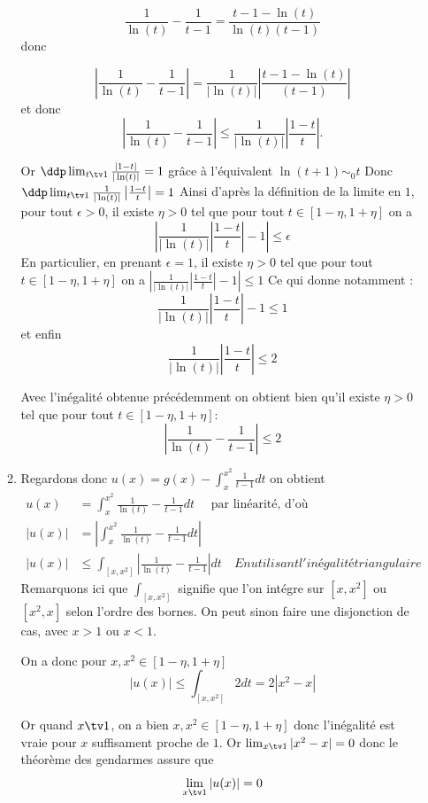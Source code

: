\begin{correction}
\begin{enumerate}
\begin{enumerate}
$$\frac{1}{\ln(t)} -\frac{1}{t-1} = \frac{t-1 -\ln(t)}{\ln(t)(t-1)}$$
donc 


$$\left| \frac{1}{\ln(t)} -\frac{1}{t-1}\right| =\frac{1}{|\ln(t)|}\left|\frac{t-1 -\ln(t)}{(t-1)}\right|$$
et donc 
$$\left| \frac{1}{\ln(t)} -\frac{1}{t-1}\right| \leq \frac{1}{|\ln(t)|}\left|\frac{1-t}{t}\right|.$$

Or $\ddp \lim_{t\tv 1} \frac{|1-t|}{|\ln(t)|}=1$ grâce à l'équivalent $\ln(t+1) \sim_0 t$
Donc $\ddp \lim_{t\tv 1}  \frac{1}{|\ln(t)|}\left|\frac{1-t}{t}\right| = 1$ 
Ainsi d'après la définition de la limite en $1$, pour tout $\epsilon>0$, il existe $\eta>0 $ tel que pour tout $t\in [1-\eta, 1+\eta]$ on a 
$$ \left| \frac{1}{|\ln(t)|}\left|\frac{1-t}{t}\right|  -1 \right|\leq \epsilon$$
En particulier, en prenant $\epsilon=1$, il existe $\eta>0$ tel que  pour tout $t\in [1-\eta, 1+\eta]$ on a  
$ \left| \frac{1}{|\ln(t)|}\left|\frac{1-t}{t}\right|  -1 \right| \leq 1$
Ce qui donne notamment : 
$$\frac{1}{|\ln(t)|}\left|\frac{1-t}{t}\right|  -1  \leq 1$$ et enfin 
$$\frac{1}{|\ln(t)|}\left|\frac{1-t}{t}\right|  \leq   2$$

Avec l'inégalité obtenue précédemment on obtient bien qu'il existe $\eta>0$ tel que pour tout $t\in [1-\eta,1+\eta]$: 
$$\left| \frac{1}{\ln(t)} -\frac{1}{t-1}\right| \leq 2 $$

\item Regardons donc $u(x)= g(x) -\int_x^{x^2} \frac{1}{t-1} dt $ on obtient 
\begin{align*}
u(x) &= \int_x^{x^2} \frac{1}{\ln(t)} - \frac{1}{t-1} dt \quad \text{ par linéarité, d'où} \\
|u(x) |& = \left| \int_x^{x^2} \frac{1}{\ln(t)} - \frac{1}{t-1} dt\right| \\
|u(x)| &\leq \int_{[x, {x^2}]}  \left| \frac{1}{\ln(t)} - \frac{1}{t-1} \right|dt \quad{ En utilisant l'inégalité triangulaire}
\end{align*}
Remarquons ici que  $\int_{[x, {x^2}]}  $ signifie que l'on intégre sur $[x,x^2]$ ou $[x^2,x]$ selon l'ordre des bornes. On peut sinon faire une disjonction de cas, avec $x>1$ ou $x<1$. 

On a donc pour $x,x^2\in [1-\eta, 1+\eta]$ 
$$|u(x)| \leq \int_{[x, {x^2}]} 2dt = 2|x^2-x| $$  

Or quand $x\tv 1$, on a bien $x,x^2 \in   [1-\eta, 1+\eta]$  donc l'inégalité est vraie pour $x$ suffisament proche de $1$. 
Or $\lim_{x\tv 1} |x^2-x|=  0$ donc le théorème des gendarmes assure que 
$$\lim_{x\tv 1} |u(x) | =0$$


\end{enumerate}
\end{enumerate}
\end{correction}
